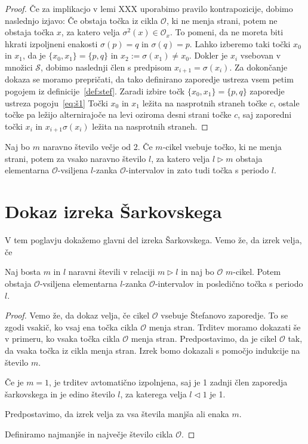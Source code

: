 \documentclass[mat2]{fmfdelo}
\begin{document}
\begin{proof}
Če za implikacjo v lemi XXX uporabimo pravilo kontrapozicije, dobimo naslednjo izjavo: Če obstaja točka iz cikla $\mathcal{O}$, ki ne menja strani, potem ne obstaja točka $x$, za katero velja $\sigma^2(x) \in \mathcal{O}_x$. To pomeni, da ne moreta biti hkrati izpoljneni enakosti $\sigma(p) = q$ in $\sigma(q) = p$. Lahko izberemo taki točki $x_0$ in $x_1$, da je $\{x_0, x_1\} = \{p, q\}$ in $x_2 := \sigma(x_1) \neq x_0$. Dokler je $x_i$ vsebovan v množici $\mathcal{S}$, dobimo naslednji člen s predpisom $x_{i+1} = \sigma(x_i)$.
Za dokončanje dokaza se moramo prepričati, da tako definirano zaporedje ustreza vsem petim pogojem iz definicije~\ref{def:stef}.
Zaradi izbire točk $\{x_0, x_1\} = \{p, q\}$ zaporedje ustreza pogoju~\ref{eq:š1}
Točki $x_0$ in $x_1$ ležita na nasprotnih straneh točke $c$, ostale točke pa ležijo alternirajoče na levi oziroma desni strani točke $c$, saj zaporedni točki $x_i$ in $x_{i+1}\sigma(x_i)$ ležita na nasprotnih straneh.
 
\end{proof}

\begin{trditev}
Naj bo $m$ naravno število večje od 2. Če $m$-cikel vsebuje točko, ki ne menja strani, potem za vsako naravno število $l$, za katero velja $l \triangleright m$ obstaja elementarna $\mathcal{O}$-vsiljena $l$-zanka $\mathcal{O}$-intervalov in zato tudi točka s periodo $l$.
\end{trditev}
\section{Dokaz izreka Šarkovskega}
V tem poglavju dokažemo glavni del izreka Šarkovskega. Vemo že, da izrek velja, če 
\begin{trditev}
Naj bosta $m$ in $l$ naravni števili v relaciji $m \triangleright l$ in naj bo $\mathcal{O}$ $m$-cikel. Potem obstaja $\mathcal{O}$-vsiljena elementarna $l$-zanka $\mathcal{O}$-intervalov in posledično točka s periodo $l$.
\end{trditev}

\begin{proof}
Vemo že, da dokaz velja, če cikel $\mathcal{O}$ vsebuje Štefanovo zaporedje. To se zgodi vsakič, ko vsaj ena točka cikla $\mathcal{O}$ menja stran. Trditev moramo dokazati še v primeru, ko vsaka točka cikla $\mathcal{O}$ menja stran. Predpostavimo, da je cikel $\mathcal{O}$ tak, da vsaka točka iz cikla menja stran. 
Izrek bomo dokazali s pomočjo indukcije na število $m$. 

Če je $m=1$, je trditev avtomatično izpolnjena, saj je 1 zadnji člen zaporedja šarkovskega in je edino število $l$, za katerega velja $l \triangleleft 1$ je 1. 

Predpostavimo, da izrek velja za vsa števila manjša ali enaka $m$. 

Definiramo najmanjše in največje število cikla $\mathcal{O}$. 
\end{proof}
\end{document}
